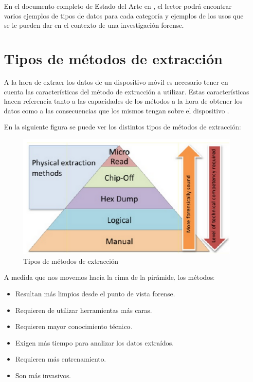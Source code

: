 En el documento completo de Estado del Arte en \cite{estadoDelArte}, el lector podrá encontrar varios ejemplos de tipos de datos para cada categoría y ejemplos de los usos que se le pueden dar en el contexto de una investigación forense.

\section{Tipos de métodos de extracción}
\label{tiposDeMetodosExtraccion}

A la hora de extraer los datos de un dispositivo móvil es necesario tener en cuenta las características del método de extracción a utilizar. Estas características hacen referencia tanto a las capacidades de los métodos a la hora de obtener los datos como a las consecuencias que los mismos tengan sobre el dispositivo \cite{cellphoneevidence}.

En la siguiente figura se puede ver los distintos tipos de métodos de extracción:

\begin{figure}[H]
    \begin{center}
        \includegraphics[width=\textwidth]{figures/extraction_methods_types}
        \caption{Tipos de métodos de extracción}
    \end{center}
\end{figure}

A medida que nos movemos hacia la cima de la pirámide, los métodos:

\begin{itemize}
\item Resultan más limpios desde el punto de vista forense.
\item Requieren de utilizar herramientas más caras.
\item Requieren mayor conocimiento técnico.
\item Exigen más tiempo para analizar los datos extraídos.
\item Requieren más entrenamiento.
\item Son más invasivos.
\end{itemize}

